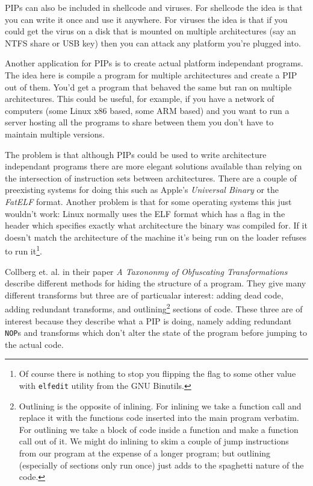 \documentclass[]{book}
\begin{document}
PIPs can also be included in shellcode and viruses. For shellcode the
idea is that you can write it once and use it anywhere. For viruses the
idea is that if you could get the virus on a disk that is mounted on
multiple architectures (say an NTFS share or USB key) then you can
attack any platform you're plugged into.

Another application for PIPs is to create actual platform independant
programs. The idea here is compile a program for multiple architectures
and create a PIP out of them. You'd get a program that behaved the same
but ran on multiple architectures. This could be useful, for example, if
you have a network of computers (some Linux x86 based, some ARM based)
and you want to run a server hosting all the programs to share between
them you don't have to maintain multiple versions.

The problem is that although PIPs could be used to write architecture
independant programs there are more elegant solutions available than
relying on the intersection of instruction sets between architectures.
There are a couple of preexisting systems for doing this such as Apple's
\emph{Universal Binary} or the \emph{FatELF}\autocite{Icculus:vl}
format. Another problem is that for some operating systems this just
wouldn't work: Linux normally uses the ELF format\autocite{mancx:th}
which has a flag in the header which specifies exactly what architecture
the binary was compiled for. If it doesn't match the architecture of the
machine it's being run on the loader refuses to run it\footnote{Of
  course there is nothing to stop you flipping the flag to some other
  value with \lstinline!elfedit! utility from the GNU Binutils.}.

Collberg et. al. in their paper \emph{A Taxononmy of Obfuscating
Transformations}\autocite{Collberg:1997vt} describe different methods
for hiding the structure of a program. They give many different
transforms but three are of particualar interest: adding dead code,
adding redundant transforms, and outlining\footnote{Outlining is the
  opposite of inlining. For inlining we take a function call and replace
  it with the functions code inserted into the main program verbatim.
  For outlining we take a block of code inside a function and make a
  function call out of it. We might do inlining to skim a couple of jump
  instructions from our program at the expense of a longer program; but
  outlining (especially of sections only run once) just adds to the
  spaghetti nature of the code.} sections of code. These three are of
interest because they describe what a PIP is doing, namely adding
redundant \lstinline!NOP!s and transforms which don't alter the state of
the program before jumping to the actual code.
\end{document}
